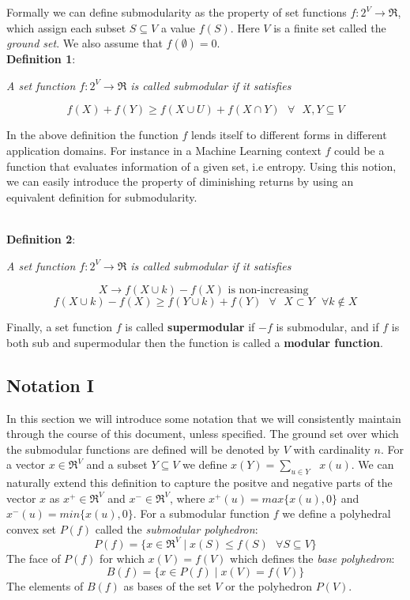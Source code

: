 Formally we can define submodularity as the property of set functions $f:2^V \rightarrow \Re$, which assign each subset $S \subseteq V$ a value $f(S)$. Here $V$ is a finite set called the {\it ground set}. We also assume that $f(\emptyset) = 0$.\\

{\bf Definition 1}: {\it A set function $f:2^V \rightarrow \Re$ is called submodular if it satisfies

\[
 f(X) + f(Y) \geq f(X \cup U) + f(X \cap Y) \text{  } \forall \text{  } X,Y \subseteq V
\]

In the above definition the function $f$ lends itself to different forms in different application domains. For instance in a Machine Learning context $f$ could be a function that evaluates information of a given set, i.e entropy. Using this notion, we can easily introduce the property of diminishing returns by using an equivalent definition for submodularity.}\\

{\bf Definition 2}: {\it A set function $f:2^V \rightarrow \Re$ is called submodular if it satisfies

\[
 X \rightarrow f(X\cup {k}) - f(X) \text{ is non-increasing }
 \]
 \[
 f(X \cup {k}) - f(X) \geq f(Y \cup {k}) + f(Y) \text{  } \forall \text{  } X\subset Y \text{  } \forall k \notin X
\]

Finally, a set function $f$ is called {\bf supermodular} if $-f$ is submodular, and if $f$ is both sub and supermodular then the function is called a {\bf modular function}.}

\subsection{Notation I}
\label{sec:notation}
In this section we will introduce some notation that we will consistently maintain through the course of this document, unless specified. The ground set over which the submodular functions are defined will be denoted by $V$ with cardinality $n$. For a vector $x \in \Re^V$ and a subset $Y \subseteq V$ we define $x(Y) = \underset{u \in Y}{\operatorname{\sum }}\text{ } x(u)$. We can naturally extend this definition to capture the positve and negative parts of the vector $x$ as $x^+\in \Re^V$ and $x^-\in \Re^V$, where $x^+(u) = max\{x(u),0\}$ and $x^-(u) = min\{x(u),0\}$. For a submodular function $f$ we define a polyhedral convex set $P(f)$ called the {\it submodular polyhedron}:
\[
 P(f) = \{ x\in \Re^V \mid x(S) \leq f(S) \text{ }\forall S\subseteq V \}
\]
The face of $P(f)$ for which $x(V) = f(V)$ which defines the {\it base polyhedron}:
\[
 B(f) = \{ x \in P(f) \mid x(V) = f(V)\}
\]
The elements of $B(f)$ as bases of the set $V$ or the polyhedron $P(V)$.


